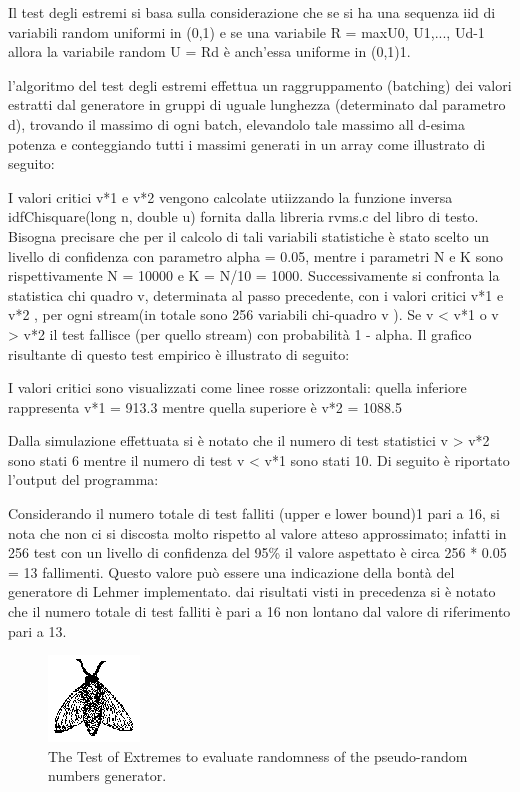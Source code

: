 Il test degli estremi si basa sulla considerazione che se si ha una sequenza iid di variabili random uniformi in (0,1) e se una variabile R = max{U0, U1,..., Ud-1} allora la variabile random U = Rd è anch’essa uniforme in (0,1)1.

l’algoritmo del test degli estremi effettua un raggruppamento (batching) dei valori estratti dal generatore in gruppi di uguale lunghezza (determinato dal parametro d), trovando il massimo di ogni batch, elevandolo tale massimo all d-esima potenza e conteggiando tutti i massimi generati in un array come illustrato di seguito:

I valori critici v*1 e v*2 vengono calcolate utiizzando la funzione inversa idfChisquare(long n, double u)  fornita dalla libreria rvms.c del libro di testo. Bisogna precisare che per il calcolo di tali variabili statistiche è stato scelto un livello di confidenza con parametro alpha = 0.05, mentre i parametri N e K sono rispettivamente N = 10000 e K = N/10 = 1000.
Successivamente si confronta la statistica chi quadro v, determinata al passo precedente,  con i valori critici  v*1 e v*2 , per ogni stream(in totale sono 256 variabili chi-quadro v ).
Se v < v*1 o v > v*2 il test fallisce (per quello stream) con probabilità 1 - alpha.
Il grafico risultante di questo test empirico è illustrato di seguito:

I valori critici sono visualizzati come linee rosse orizzontali: quella inferiore rappresenta
v*1 = 913.3 mentre quella superiore è v*2 = 1088.5

Dalla simulazione effettuata si è notato che il numero di test statistici v > v*2 sono stati 6 mentre il numero di test v < v*1 sono stati 10. Di seguito è riportato l’output del programma:

Considerando il numero totale di test falliti (upper e lower bound)1 pari a 16, si nota che non ci si discosta molto rispetto al valore atteso approssimato; infatti in 256 test con un livello di confidenza del 95\% il valore aspettato è circa 256 * 0.05 = 13 fallimenti. Questo valore può essere una indicazione della bontà del generatore di Lehmer implementato.
dai risultati visti in precedenza si è notato che il numero totale di test falliti è pari a 16 non lontano dal valore di riferimento pari a 13.

\begin{figure}
  \label{fig:experimental-analysis-randomness-extremes}
  \includegraphics{fig/fly}
  \caption{The Test of Extremes to evaluate randomness of the pseudo-random numbers generator.}
\end{figure}



